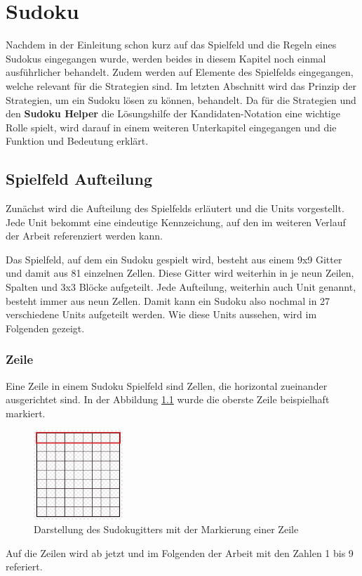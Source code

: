 

\chapter{Sudoku}
Nachdem in der Einleitung schon kurz auf das Spielfeld und die Regeln eines Sudokus eingegangen wurde, werden beides in diesem Kapitel noch einmal ausführlicher behandelt. Zudem werden auf Elemente des Spielfelds eingegangen, welche relevant für die Strategien sind. Im letzten Abschnitt wird das Prinzip der Strategien, um ein Sudoku lösen zu können, behandelt. Da für die Strategien und den \textbf{Sudoku Helper} die Lösungshilfe der Kandidaten-Notation eine wichtige Rolle spielt, wird darauf in einem weiteren Unterkapitel eingegangen und die Funktion und Bedeutung erklärt.



\section{Spielfeld Aufteilung}
Zunächst wird die Aufteilung des Spielfelds erläutert und die Units vorgestellt. Jede Unit bekommt eine eindeutige Kennzeichung, auf den im weiteren Verlauf der Arbeit referenziert werden kann.

Das Spielfeld, auf dem ein Sudoku gespielt wird, besteht aus einem 9x9 Gitter und damit aus 81 einzelnen Zellen. Diese Gitter wird weiterhin in je neun Zeilen, Spalten und 3x3 Blöcke aufgeteilt. Jede Aufteilung, weiterhin auch Unit genannt, besteht immer aus neun Zellen. Damit kann ein Sudoku also nochmal in 27 verschiedene Units aufgeteilt werden. Wie diese Units aussehen, wird im Folgenden gezeigt. \cite{sudopedia_2022}

\newpage

\subsection{Zeile}
Eine Zeile in einem Sudoku Spielfeld sind Zellen, die horizontal zueinander ausgerichtet sind. In der Abbildung \ref{fig:SudokugitterZeile} wurde die oberste Zeile beispielhaft markiert.
\begin{figure}[H]
	\centering
	\includegraphics[width=0.3\textwidth]{images/sudokugitterZeile.jpg}
	\caption{Darstellung des Sudokugitters mit der Markierung einer Zeile}
	\label{fig:SudokugitterZeile}
\end{figure}
Auf die Zeilen wird ab jetzt und im Folgenden der Arbeit mit den Zahlen 1 bis 9 referiert. 


